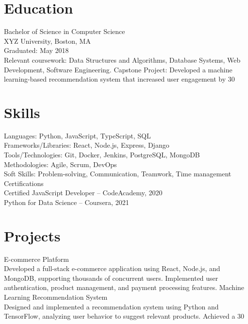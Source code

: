 \documentclass[10pt]{article}
\begin{document}
\section{Education}
Bachelor of Science in Computer Science \\
XYZ University, Boston, MA \\
Graduated: May 2018 \\
Relevant coursework: Data Structures and Algorithms, Database Systems, Web Development, Software Engineering.
Capstone Project: Developed a machine learning-based recommendation system that increased user engagement by 30%

\section{Skills}
Languages: Python, JavaScript, TypeScript, SQL \\
Frameworks/Libraries: React, Node.js, Express, Django \\
Tools/Technologies: Git, Docker, Jenkins, PostgreSQL, MongoDB \\
Methodologies: Agile, Scrum, DevOps \\
Soft Skills: Problem-solving, Communication, Teamwork, Time management \\
Certifications \\
Certified JavaScript Developer – CodeAcademy, 2020 \\
Python for Data Science – Coursera, 2021 \\

\section{Projects}
E-commerce Platform \\
Developed a full-stack e-commerce application using React, Node.js, and MongoDB, supporting thousands of concurrent users.
Implemented user authentication, product management, and payment processing features.
Machine Learning Recommendation System \\
Designed and implemented a recommendation system using Python and TensorFlow, analyzing user behavior to suggest relevant products.
Achieved a 30%
\end{document}
